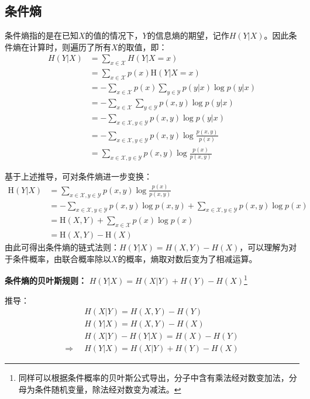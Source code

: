 \documentclass[12pt,a4paper]{article}
\begin{document}
  \subsection{条件熵}
  条件熵指的是在已知$X$的值的情况下，$Y$的信息熵的期望，记作$H(Y|X)$。因此条件熵在计算时，则遍历了所有$X$的取值，即：
  $$
  \begin{aligned}
    H(Y|X) &= \sum\limits _{x\in \mathcal{X}} H(Y|X=x) \\ 
    & = \sum_{x \in \mathcal{X}} p(x) \mathrm{H}(Y | X=x) \\ 
    & =-\sum_{x \in \mathcal{X}} p(x) \sum_{y \in \mathcal{Y}} p(y | x) \log p(y | x)
    \\ 
    &=-\sum_{x \in \mathcal{X}} \sum_{y \in \mathcal{Y}} p(x, y) \log p(y | x)\\ 
    & =-\sum_{x \in \mathcal{X}, y \in \mathcal{Y}} p(x, y) \log p(y | x)\\ 
    &=-\sum_{x \in \mathcal{X}, y \in \mathcal{Y}} p(x, y) \log \frac{p(x, y)}{p(x)} \\ 
    &=\sum_{x \in \mathcal{X}, y \in \mathcal{Y}} p(x, y) \log \frac{p(x)}{p(x, y)}
  \end{aligned}
  $$

  基于上述推导，可对条件熵进一步变换：
  $$
  \begin{aligned} \mathrm{H}(Y | X) &=\sum_{x \in \mathcal{X}, y \in \mathcal{Y}} p(x, y) \log \frac{p(x)}{p(x, y)} \\ &=-\sum_{x \in \mathcal{X}, y \in \mathcal{Y}} p(x, y) \log p(x, y)+\sum_{x \in \mathcal{X}, y \in \mathcal{Y}} p(x, y) \log p(x) \\ &=\mathrm{H}(X, Y)+\sum_{x \in \mathcal{X}} p(x) \log p(x) \\ &=\mathrm{H}(X, Y)-\mathrm{H}(X) \end{aligned}
  $$
  由此可得出条件熵的链式法则：$H(Y|X)=H(X,Y)-H(X)$，可以理解为对于条件概率，由联合概率除以$X$的概率，熵取对数后变为了相减运算。

  \textbf{条件熵的贝叶斯规则：} $H(Y|X) = H(X|Y) + H(Y) - H(X)$\footnote{同样可以根据条件概率的贝叶斯公式导出，分子中含有乘法经对数变加法，分母为条件随机变量，除法经对数变为减法。}

  推导：
  $$
  \begin{aligned}
    &H(X|Y) = H(X,Y) - H(Y) \\
    &H(Y|X) = H(X,Y) - H(X) \\ 
    &H(X|Y)-H(Y|X) = H(X) - H(Y)\\
    \Rightarrow \;\;&H(Y|X) = H(X|Y)+H(Y) - H(X)
  \end{aligned}
  $$
\end{document}
